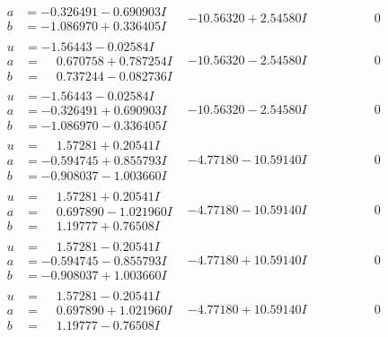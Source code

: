 \documentclass[1p]{elsarticle_modified}
\theoremstyle{definition}
\begin{document}
$$\begin{array}{c|c|c}
\begin{aligned}
a &= -0.326491 - 0.690903 I \\
b &= -1.086970 + 0.336405 I\end{aligned}
 & -10.56320 + 2.54580 I & \phantom{-0.000000 } 0 \\ \hline\begin{aligned}
u &= -1.56443 - 0.02584 I \\
a &= \phantom{-}0.670758 + 0.787254 I \\
b &= \phantom{-}0.737244 - 0.082736 I\end{aligned}
 & -10.56320 - 2.54580 I & \phantom{-0.000000 } 0 \\ \hline\begin{aligned}
u &= -1.56443 - 0.02584 I \\
a &= -0.326491 + 0.690903 I \\
b &= -1.086970 - 0.336405 I\end{aligned}
 & -10.56320 - 2.54580 I & \phantom{-0.000000 } 0 \\ \hline\begin{aligned}
u &= \phantom{-}1.57281 + 0.20541 I \\
a &= -0.594745 + 0.855793 I \\
b &= -0.908037 - 1.003660 I\end{aligned}
 & -4.77180 - 10.59140 I & \phantom{-0.000000 } 0 \\ \hline\begin{aligned}
u &= \phantom{-}1.57281 + 0.20541 I \\
a &= \phantom{-}0.697890 - 1.021960 I \\
b &= \phantom{-}1.19777 + 0.76508 I\end{aligned}
 & -4.77180 - 10.59140 I & \phantom{-0.000000 } 0 \\ \hline\begin{aligned}
u &= \phantom{-}1.57281 - 0.20541 I \\
a &= -0.594745 - 0.855793 I \\
b &= -0.908037 + 1.003660 I\end{aligned}
 & -4.77180 + 10.59140 I & \phantom{-0.000000 } 0 \\ \hline\begin{aligned}
u &= \phantom{-}1.57281 - 0.20541 I \\
a &= \phantom{-}0.697890 + 1.021960 I \\
b &= \phantom{-}1.19777 - 0.76508 I\end{aligned}
 & -4.77180 + 10.59140 I & \phantom{-0.000000 } 0 \\ \hline\begin{aligned}

\end{aligned}
\end{array}$$
\end{document}
